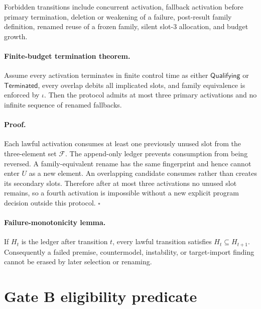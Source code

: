 \documentclass[11pt]{article}
\newcommand{\Fam}{\mathcal{F}}
\newcommand{\Term}{\mathsf{Terminated}}
\newcommand{\Qual}{\mathsf{Qualifying}}
\begin{document}
Forbidden transitions include concurrent activation, fallback activation
before primary termination, deletion or weakening of a failure, post-result
family definition, renamed reuse of a frozen family, silent slot-3 allocation,
and budget growth.

\paragraph{Finite-budget termination theorem.}
Assume every activation terminates in finite control time as either
$\Qual$ or $\Term$, every overlap debits all implicated slots, and family
equivalence is enforced by $\iota$. Then the protocol admits at most three
primary activations and no infinite sequence of renamed fallbacks.

\paragraph{Proof.}
Each lawful activation consumes at least one previously unused slot from the
three-element set $\Fam$. The append-only ledger prevents consumption from
being reversed. A family-equivalent rename has the same fingerprint and hence
cannot enter $U$ as a new element. An overlapping candidate consumes rather
than creates its secondary slots. Therefore after at most three activations no
unused slot remains, so a fourth activation is impossible without a new
explicit program decision outside this protocol. $\square$

\paragraph{Failure-monotonicity lemma.}
If $H_t$ is the ledger after transition $t$, every lawful transition satisfies
$H_t\subseteq H_{t+1}$. Consequently a failed premise, countermodel, instability,
or target-import finding cannot be erased by later selection or renaming.

\section{Gate B eligibility predicate}
\end{document}
